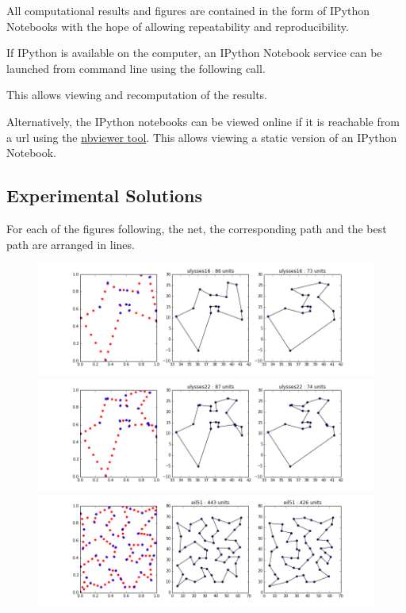 \documentclass{article} %
\begin{document}
All computational results and figures are contained in the form of IPython Notebooks with the hope of allowing repeatability and reproducibility.


If IPython is available on the computer, an IPython Notebook service can be launched from command line using the following call.


This allows viewing and recomputation of the results.\newline


Alternatively, the IPython notebooks can be viewed online if it is reachable from a url using the \href{http://nbviewer.IPython.org/}{nbviewer tool}. This allows viewing a static version of an IPython Notebook.



\subsection{Experimental Solutions}

For each of the figures following, the net, the corresponding path and the best path are arranged in lines.

\begin{figure}[!htb]
\begin{center}
\includegraphics[scale=0.45]{figs/ulysses16}
\includegraphics[scale=0.45]{figs/ulysses22}
\includegraphics[scale=0.45]{figs/eil51}
 \end{center}
\end{figure}
\end{document}
